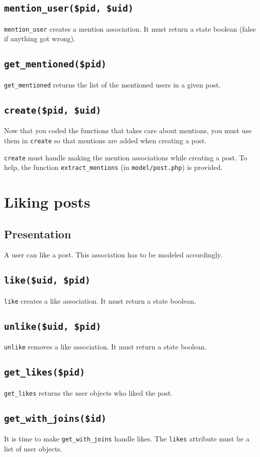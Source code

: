 \documentclass[twoside,a4paper,12pt]{article}
\begin{document}
\subsection{\texttt{mention\_user(\$pid, \$uid)}}
\texttt{mention\_user} creates a mention association. It must return a state boolean (false if anything got wrong).

\subsection{\texttt{get\_mentioned(\$pid)}}
\texttt{get\_mentioned} returns the list of the mentioned users in a given post.

\subsection{\texttt{create(\$pid, \$uid)}}
Now that you coded the functions that takes care about mentions, you must use them in \texttt{create} so that mentions are added when creating a post.

\texttt{create} must handle making the mention associations while creating a post. To help, the function \texttt{extract\_mentions} (in \texttt{model/post.php}) is provided.

\section{Liking posts}

\subsection{Presentation}
A user can like a post. This association has to be modeled accordingly.

\subsection{\texttt{like(\$uid, \$pid)}}
\texttt{like} creates a like association. It must return a state boolean.

\subsection{\texttt{unlike(\$uid, \$pid)}}
\texttt{unlike} removes a like association. It must return a state boolean.

\subsection{\texttt{get\_likes(\$pid)}}
\texttt{get\_likes} returns the user objects who liked the post.

\subsection{\texttt{get\_with\_joins(\$id)}}
It is time to make \texttt{get\_with\_joins} handle likes. The \texttt{likes} attribute must be a list of user objects.
\end{document}
